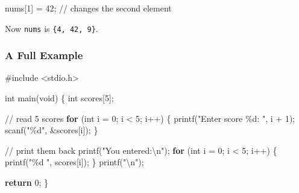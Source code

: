 \documentclass[
  letterpaper,
  DIV=11,
  numbers=noendperiod]{scrreprt}
\newenvironment{Shaded}{\begin{snugshade}}{\end{snugshade}}
\newcommand{\CommentTok}[1]{\textcolor[rgb]{0.37,0.37,0.37}{#1}}
\newcommand{\ControlFlowTok}[1]{\textcolor[rgb]{0.00,0.23,0.31}{\textbf{#1}}}
\newcommand{\DataTypeTok}[1]{\textcolor[rgb]{0.68,0.00,0.00}{#1}}
\newcommand{\DecValTok}[1]{\textcolor[rgb]{0.68,0.00,0.00}{#1}}
\newcommand{\ImportTok}[1]{\textcolor[rgb]{0.00,0.46,0.62}{#1}}
\newcommand{\NormalTok}[1]{\textcolor[rgb]{0.00,0.23,0.31}{#1}}
\newcommand{\OperatorTok}[1]{\textcolor[rgb]{0.37,0.37,0.37}{#1}}
\newcommand{\PreprocessorTok}[1]{\textcolor[rgb]{0.68,0.00,0.00}{#1}}
\newcommand{\SpecialCharTok}[1]{\textcolor[rgb]{0.37,0.37,0.37}{#1}}
\newcommand{\StringTok}[1]{\textcolor[rgb]{0.13,0.47,0.30}{#1}}
\begin{document}
\begin{Shaded}
\begin{Highlighting}[]
\NormalTok{nums}\OperatorTok{[}\DecValTok{1}\OperatorTok{]} \OperatorTok{=} \DecValTok{42}\OperatorTok{;}  \CommentTok{// changes the second element}
\end{Highlighting}
\end{Shaded}

Now \texttt{nums} is \texttt{\{4,\ 42,\ 9\}}.

\subsubsection{A Full Example}\label{a-full-example-10}

\begin{Shaded}
\begin{Highlighting}[]
\PreprocessorTok{\#include }\ImportTok{\textless{}stdio.h\textgreater{}}

\DataTypeTok{int}\NormalTok{ main}\OperatorTok{(}\DataTypeTok{void}\OperatorTok{)} \OperatorTok{\{}
    \DataTypeTok{int}\NormalTok{ scores}\OperatorTok{[}\DecValTok{5}\OperatorTok{];}

    \CommentTok{// read 5 scores}
    \ControlFlowTok{for} \OperatorTok{(}\DataTypeTok{int}\NormalTok{ i }\OperatorTok{=} \DecValTok{0}\OperatorTok{;}\NormalTok{ i }\OperatorTok{\textless{}} \DecValTok{5}\OperatorTok{;}\NormalTok{ i}\OperatorTok{++)} \OperatorTok{\{}
\NormalTok{        printf}\OperatorTok{(}\StringTok{"Enter score }\SpecialCharTok{\%d}\StringTok{: "}\OperatorTok{,}\NormalTok{ i }\OperatorTok{+} \DecValTok{1}\OperatorTok{);}
\NormalTok{        scanf}\OperatorTok{(}\StringTok{"}\SpecialCharTok{\%d}\StringTok{"}\OperatorTok{,} \OperatorTok{\&}\NormalTok{scores}\OperatorTok{[}\NormalTok{i}\OperatorTok{]);}
    \OperatorTok{\}}

    \CommentTok{// print them back}
\NormalTok{    printf}\OperatorTok{(}\StringTok{"You entered:}\SpecialCharTok{\textbackslash{}n}\StringTok{"}\OperatorTok{);}
    \ControlFlowTok{for} \OperatorTok{(}\DataTypeTok{int}\NormalTok{ i }\OperatorTok{=} \DecValTok{0}\OperatorTok{;}\NormalTok{ i }\OperatorTok{\textless{}} \DecValTok{5}\OperatorTok{;}\NormalTok{ i}\OperatorTok{++)} \OperatorTok{\{}
\NormalTok{        printf}\OperatorTok{(}\StringTok{"}\SpecialCharTok{\%d}\StringTok{ "}\OperatorTok{,}\NormalTok{ scores}\OperatorTok{[}\NormalTok{i}\OperatorTok{]);}
    \OperatorTok{\}}
\NormalTok{    printf}\OperatorTok{(}\StringTok{"}\SpecialCharTok{\textbackslash{}n}\StringTok{"}\OperatorTok{);}

    \ControlFlowTok{return} \DecValTok{0}\OperatorTok{;}
\OperatorTok{\}}
\end{Highlighting}
\end{Shaded}
\end{document}
